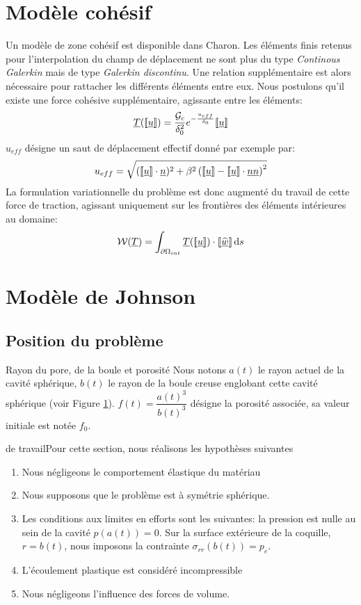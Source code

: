 \documentclass[10pt]{book}
\newcommand{\Gc}{\Gg_{c}}
\begin{document}
\section{Modèle cohésif}\label{Section:Modèle cohésif}
Un modèle de zone cohésif est disponible dans Charon. Les éléments finis retenus pour l'interpolation du champ de déplacement ne sont plus du type \emph{Continous Galerkin} mais de type \emph{Galerkin discontinu}. Une relation supplémentaire est alors nécessaire pour rattacher les différents éléments entre eux. Nous postulons qu'il existe une force cohésive supplémentaire, agissante entre les éléments:
$$\vec{T}(\jump{\Dep})=\dfrac{\Gc}{\delta_{0}^{2}}e^{-\frac{u_{eff}}{\delta_{0}}}\jump{\Dep}$$
$u_{eff}$ désigne un saut de déplacement effectif donné par exemple par:
$$u_{eff}=\sqrt{(\lbrack\!\lbrack \underline{u} \rbrack\!\rbrack\cdot\underline{n})^{2}+\beta^{2}\left(\lbrack\!\lbrack \underline{u} \rbrack\!\rbrack-\lbrack\!\lbrack \underline{u} \rbrack\!\rbrack\cdot\underline{n}\underline{n}\right)^{2}}$$
La formulation variationnelle du problème est donc augmenté du travail de cette force de traction, agissant uniquement sur les frontières des éléments intérieures au domaine:
$$\mathcal{W}(\underline{T})=\int_{\partial\Omega_{int}}\underline{T}(\lbrack\!\lbrack \underline{u} \rbrack\!\rbrack)\cdot\lbrack\!\lbrack \widehat{\underline{w}} \rbrack\!\rbrack\,\mathrm{d}s$$

\section{Modèle de Johnson}
\subsection{Position du problème}
\begin{Not}{Rayon du pore, de la boule et porosité} Nous notons $a(t)$ le rayon actuel de la cavité sphérique, $b(t)$ le rayon de la boule creuse englobant cette cavité sphérique (voir Figure \ref{pore_unique}). $\displaystyle f(t)=\dfrac{a(t)^3}{b(t)^3}$ désigne la porosité associée, sa valeur initiale est notée $f_0$.
 \end{Not}
\begin{Hypothese}{ de travail}Pour cette section, nous réalisons les hypothèses suivantes
\begin{enumerate}
\item Nous négligeons le comportement élastique du matériau
\item Nous supposons que le problème est à symétrie sphérique.
\item Les conditions aux limites en efforts sont les suivantes: la pression est nulle au sein de la cavité $p(a(t))=0$. Sur la surface extérieure de la coquille, $r=b(t)$, nous imposons la contrainte $\sigma_{rr}(b(t)) =p_e$.
\item\label{hyp4:incompressible} L'écoulement plastique est considéré incompressible
\item Nous négligeons l'influence des forces de volume.
\end{enumerate}
\end{Hypothese}
\begin{figure}[h!]
\label{pore_unique}
\end{figure}
\end{document}
